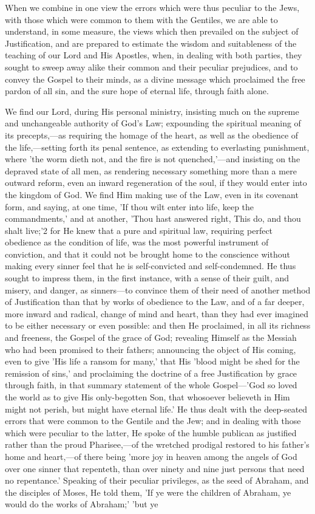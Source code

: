 \documentclass[
]{book}
\begin{document}
When we combine in one view the errors which were thus peculiar to the Jews, with those which were common to them with the Gentiles, we are able to understand, in some measure, the views which then prevailed on the subject of Justification, and are prepared to estimate the wisdom and suitableness of the teaching of our Lord and His Apostles, when, in dealing with both parties, they sought to sweep away alike their common and their peculiar prejudices, and to convey the Gospel to their minds, as a divine message which proclaimed the free pardon of all sin, and the sure hope of eternal life, through faith alone.

We find our Lord, during His personal ministry, insisting much on the supreme and unchangeable authority of God's Law; expounding the spiritual meaning of its precepts,---as requiring the homage of the heart, as well as the obedience of the life,---setting forth its penal sentence, as extending to everlasting punishment, where 'the worm dieth not, and the fire is not quenched,'---and insisting on the depraved state of all men, as rendering necessary something more than a mere outward reform, even an inward regeneration of the soul, if they would enter into the kingdom of God. We find Him making use of the Law, even in its covenant form, and saying, at one time, 'If thou wilt enter into life, keep the commandments,' and at another, 'Thou hast answered right, This do, and thou shalt live;'2 for He knew that a pure and spiritual law, requiring perfect obedience as the condition of life, was the most powerful instrument of conviction, and that it could not be brought home to the conscience without making every sinner feel that he is self-convicted and self-condemned. He thus sought to impress them, in the first instance, with a sense of their guilt, and misery, and danger, as sinners---to convince them of their need of another method of Justification than that by works of obedience to the Law, and of a far deeper, more inward and radical, change of mind and heart, than they had ever imagined to be either necessary or even possible: and then He proclaimed, in all its richness and freeness, the Gospel of the grace of God; revealing Himself as the Messiah who had been promised to their fathers; announcing the object of His coming, even to give 'His life a ransom for many,' that His 'blood might be shed for the remission of sins,' and proclaiming the doctrine of a free Justification by grace through faith, in that summary statement of the whole Gospel---'God so loved the world as to give His only-begotten Son, that whosoever believeth in Him might not perish, but might have eternal life.' He thus dealt with the deep-seated errors that were common to the Gentile and the Jew; and in dealing with those which were peculiar to the latter, He spoke of the humble publican as justified rather than the proud Pharisee,---of the wretched prodigal restored to his father's home and heart,---of there being 'more joy in heaven among the angels of God over one sinner that repenteth, than over ninety and nine just persons that need no repentance.' Speaking of their peculiar privileges, as the seed of Abraham, and the disciples of Moses, He told them, 'If ye were the children of Abraham, ye would do the works of Abraham;' 'but ye 
\end{document}
